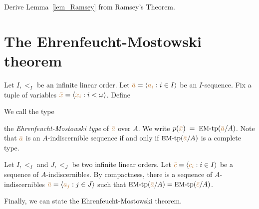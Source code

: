 \begin{exercise}
  Derive Lemma~\ref{lem_Ramsey} from Ramsey's Theorem.
\end{exercise} 


\section{The Ehrenfeucht-Mostowski theorem}\label{EM}

Let $I,<_I$ be an infinite linear order.
Let ${\color{brown}\bar a}=\langle{\color{brown}a_i}:i\in I\rangle$ be an $I$-sequence.
Fix a tuple of variables ${\color{brown}\bar x}=\langle{\color{brown}x_i}: i<\omega\rangle$.
Define 


We call the type


the \emph{Ehren\-feucht-Mostowski type\/} of ${\color{brown}\bar a}$ over $A$.
We write \emph{$p({\color{brown}\bar x})\;=\;\textrm{{\small EM}-tp}({\color{brown}\bar a}/A)$.} 
Note that ${\color{brown}\bar a}$ is an $A$-indiscernible sequence if and only if $\mbox{{\small EM}-tp}({\color{brown}\bar a}/A)$ is a complete type.

\begin{remark}\label{rem_indiscernibili_ordine}
  Let $I,<_I$ and $J,<_J$ be two infinite linear orders.
  Let ${\color{brown}\bar c}=\langle{\color{brown}c_i}:i\in I\rangle$ be a sequence of $A$-indiscernibles.
  By compactness, there is a sequence of $A$-indiscernibles ${\color{brown}\bar a}=\langle{\color{brown}a_j}:j\in J\rangle$ such that $\mbox{{\small EM}-tp}({\color{brown}\bar a}/A)=\mbox{{\small EM}-tp}({\color{brown}\bar c}/A)$.
\end{remark}

Finally, we can state the Ehrenfeucht-Mostowski theorem.

